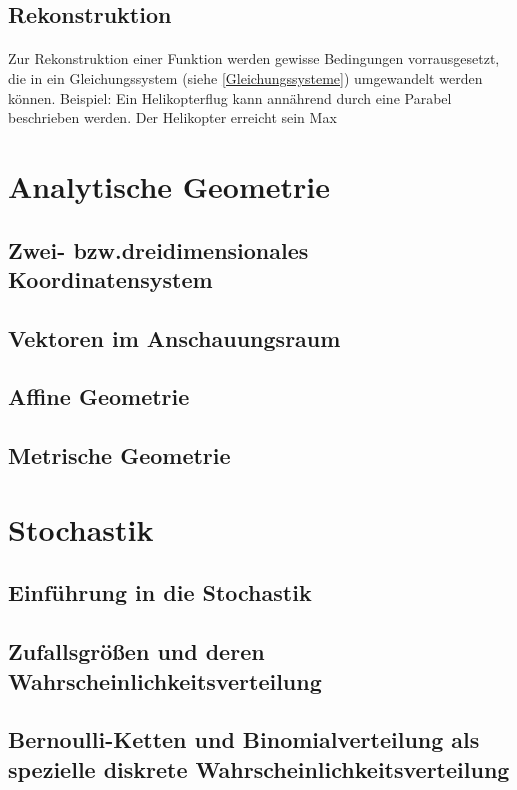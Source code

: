 \documentclass{article}
\begin{document}
\subsection{Rekonstruktion}\label{Rekonstruktion}
\paragraph{}
Zur Rekonstruktion einer Funktion werden gewisse Bedingungen vorrausgesetzt, die in ein Gleichungssystem (siehe \ref{Gleichungssysteme}) umgewandelt werden können.
Beispiel: Ein Helikopterflug kann annährend durch eine Parabel beschrieben werden.
Der Helikopter erreicht sein Max

\section{Analytische Geometrie}
\subsection{Zwei- bzw.dreidimensionales Koordinatensystem}
\subsection{Vektoren im Anschauungsraum}
\subsection{Affine Geometrie}
\subsection{Metrische Geometrie}

\section{Stochastik}
\subsection{Einführung in die Stochastik}
\subsection{Zufallsgrößen und deren Wahrscheinlichkeitsverteilung}
\subsection{Bernoulli-Ketten und Binomialverteilung als spezielle diskrete Wahrscheinlichkeitsverteilung}
\end{document}

